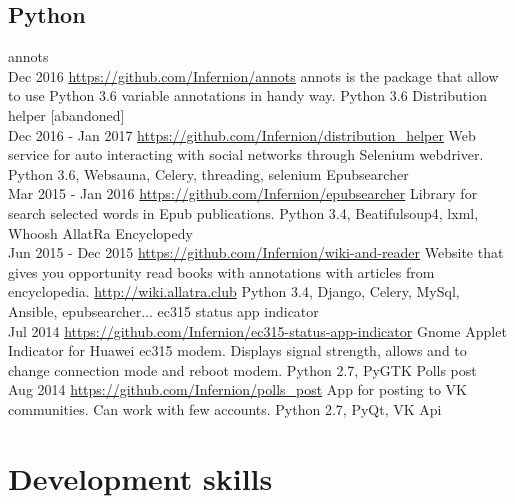 \documentclass[11pt,a4paper]{moderncv}
\begin{document}
	\subsection{Python}
	\cvline
	{annots\\ Dec 2016}
	{\url{https://github.com/Infernion/annots}\newline{}
		annots is the package that allow to use Python 3.6 variable annotations in handy way.\newline{}
		Python 3.6}
	\cvline
	{Distribution helper [abandoned]\\ Dec 2016 - Jan 2017}
	{\url{https://github.com/Infernion/distribution_helper}\newline{}
		Web service for auto interacting with social networks through Selenium webdriver.\newline{}
		Python 3.6, Websauna, Celery, threading, selenium}
	\cvline
	{Epubsearcher\\ Mar 2015 - Jan 2016}
	{\url{https://github.com/Infernion/epubsearcher}\newline{}
		Library for search selected words in Epub publications.\newline{}
		Python 3.4, Beatifulsoup4, lxml, Whoosh}
	\cvline
	{AllatRa Encyclopedy\\ Jun 2015 - Dec 2015}
	{\url{https://github.com/Infernion/wiki-and-reader}\newline{}
	    Website that gives you opportunity read books with annotations
		with articles from encyclopedia. \url{http://wiki.allatra.club}\newline{}
		Python 3.4, Django, Celery, MySql, Ansible, epubsearcher...}
    \cvline
	{ec315 status app indicator\\ Jul 2014}
	{\url{https://github.com/Infernion/ec315-status-app-indicator}\newline{}
		Gnome Applet Indicator for Huawei ec315 modem. Displays signal strength, allows and to change connection mode and reboot modem.\newline{}
		Python 2.7, PyGTK }
	\cvline
	{Polls post\\ Aug 2014}
	{\url{https://github.com/Infernion/polls_post}\newline{}
		App for posting to VK communities. Can work with few accounts.\newline{}
		Python 2.7, PyQt, VK Api}

	\section{Development skills}
\end{document}
